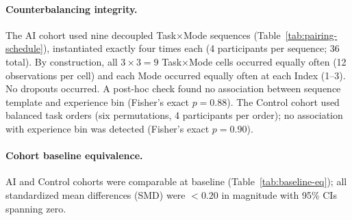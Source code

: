\documentclass[sigconf]{acmart}
\begin{document}
\paragraph{Counterbalancing integrity.}
The AI cohort used nine decoupled Task$\times$Mode sequences (Table~\ref{tab:pairing-schedule}), instantiated exactly four times each (4 participants per sequence; 36 total). By construction, all $3{\times}3=9$ Task$\times$Mode cells occurred equally often (12 observations per cell) and each Mode occurred equally often at each Index (1--3). No dropouts occurred. A post-hoc check found no association between sequence template and experience bin (Fisher’s exact $p{=}0.88$). The Control cohort used balanced task orders (six permutations, 4 participants per order); no association with experience bin was detected (Fisher’s exact $p{=}0.90$).
\paragraph{Cohort baseline equivalence.}
AI and Control cohorts were comparable at baseline (Table~\ref{tab:baseline-eq}); all standardized mean differences (SMD) were $<0.20$ in magnitude with 95\% CIs spanning zero.

\begin{table}[t]
  \centering
  \caption{Baseline equivalence (mean$\pm$SD; standardized mean differences, SMD).}
  \label{tab:baseline-eq}
  \small
\end{table}
\end{document}
